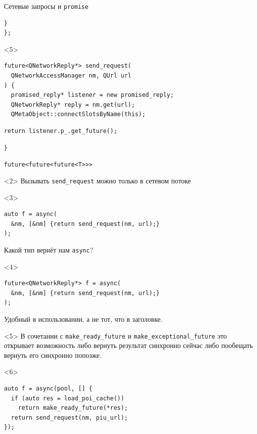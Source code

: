 \documentclass[aspectratio=169,pdf,hyperref={unicode},17pt]{beamer}
\begin{document}
\begin{frame}[fragile,t]{Сетевые запросы и \texttt{promise}}
\begin{onlyenv}
\begin{lstlisting}[style=cppcode,aboveskip=0pt,belowskip=0pt]
  }
};
\end{lstlisting}
\end{onlyenv}
\begin{onlyenv}<5>
\begin{lstlisting}[style=cppcode,aboveskip=0pt,belowskip=0pt]
future<QNetworkReply*> send_request(
  QNetworkAccessManager nm, QUrl url
) {
  promised_reply* listener = new promised_reply;
  QNetworkReply* reply = nm.get(url);
  QMetaObject::connectSlotsByName(this);
\end{lstlisting}
\begin{lstlisting}[style=cppcode,backgroundcolor=\color{gray!30},aboveskip=0pt,belowskip=0pt]
  return listener.p_.get_future();
\end{lstlisting}
\begin{lstlisting}[style=cppcode,aboveskip=0pt,belowskip=0pt]
}
\end{lstlisting}
\end{onlyenv}
\end{frame}

\begin{frame}[fragile,t]{\texttt{future<future<future<T>{}>{}>}}
\begin{onlyenv}<2>
Вызывать \texttt{send\_request} можно только в сетевом потоке
\end{onlyenv}
\begin{onlyenv}<3>
\begin{lstlisting}[style=cppcode]
auto f = async(
  &nm, [&nm] {return send_request(nm, url);}
);
\end{lstlisting}
Какой тип вернёт нам \texttt{async}?
\end{onlyenv}
\begin{onlyenv}<4>
\begin{lstlisting}[style=cppcode]
future<QNetworkReply*> f = async(
  &nm, [&nm] {return send_request(nm, url);}
);
\end{lstlisting}
Удобный в использовании, а не тот, что в заголовке.
\end{onlyenv}
\begin{onlyenv}<5>
В сочетании с \texttt{make\_ready\_future} и \texttt{make\_exceptional\_future} это открывает возможность либо вернуть результат синхронно сейчас либо пообещать вернуть его синхронно попозже.
\end{onlyenv}
\begin{onlyenv}<6>
\begin{lstlisting}[style=cppcode]
auto f = async(pool, [] {
  if (auto res = load_poi_cache())
    return make_ready_future(*res);
  return send_request(nm, piu_url);
});
\end{lstlisting}
\end{onlyenv}
\end{frame}
\end{document}
